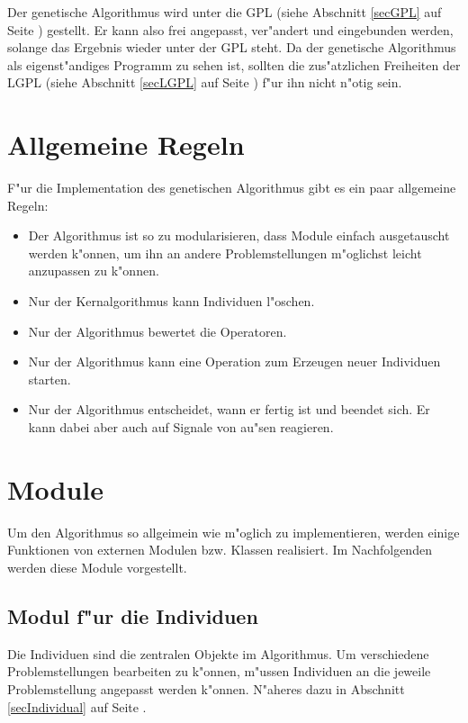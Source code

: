 Der genetische Algorithmus wird unter die GPL (siehe Abschnitt \ref{secGPL} auf Seite \pageref{secGPL}) gestellt. Er kann also frei angepasst, ver"andert und eingebunden werden, solange das Ergebnis wieder unter der GPL steht. Da der genetische Algorithmus als eigenst"andiges Programm zu sehen ist, sollten die zus"atzlichen Freiheiten der LGPL (siehe Abschnitt \ref{secLGPL} auf Seite \pageref{secLGPL}) f"ur ihn nicht n"otig sein.


\section{Allgemeine Regeln}

F"ur die Implementation des genetischen Algorithmus gibt es ein paar allgemeine Regeln:
\begin{itemize}
 \item Der Algorithmus ist so zu modularisieren, dass Module einfach ausgetauscht werden k"onnen, um ihn an andere Problemstellungen m"oglichst leicht anzupassen zu k"onnen.
 \item Nur der Kernalgorithmus kann Individuen l"oschen.
 \item Nur der Algorithmus bewertet die Operatoren.
 \item Nur der Algorithmus kann eine Operation zum Erzeugen neuer Individuen starten.
 \item Nur der Algorithmus entscheidet, wann er fertig ist und beendet sich. Er kann dabei aber auch auf Signale von au"sen reagieren.
\end{itemize}



\section{Module}

Um den Algorithmus so allgeimein wie m"oglich zu implementieren, werden einige Funktionen von externen Modulen bzw. Klassen realisiert. Im Nachfolgenden werden diese Module vorgestellt.

\subsection{Modul f"ur die Individuen}

Die Individuen sind die zentralen Objekte im Algorithmus. Um verschiedene Problemstellungen bearbeiten zu k"onnen, m"ussen Individuen an die jeweile Problemstellung angepasst werden k"onnen. N"aheres dazu in Abschnitt \ref{secIndividual} auf Seite \pageref{secIndividual}.


